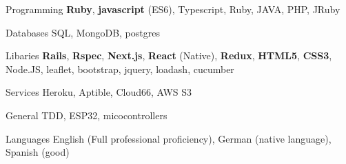

\begin{cvskills}

  \cvskill
    {Programming} %
    {\textbf{Ruby}, \textbf{javascript} (ES6), Typescript, Ruby, JAVA, PHP, JRuby } %

  \cvskill
    {Databases} %
    {SQL, MongoDB, postgres} %

  \cvskill
    {Libaries} %
    {\textbf{Rails}, \textbf{Rspec}, \textbf{Next.js}, \textbf{React} (Native), \textbf{Redux}, \textbf{HTML5}, \textbf{CSS3}, Node.JS, leaflet, bootstrap, jquery, loadash, cucumber } %


  \cvskill
    {Services} %
    {Heroku, Aptible, Cloud66, AWS S3 } %

  \cvskill
    {General} %
    {TDD, ESP32, micocontrollers} %

  \cvskill
    {Languages} %
    {English (Full professional proficiency), German (native language), Spanish (good)} %

\end{cvskills}
